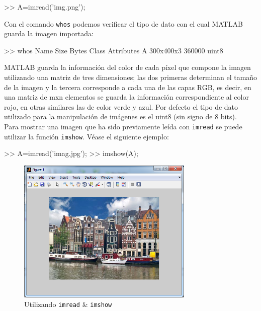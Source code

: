 \begin{matlab}
>> A=imread('img.png');
\end{matlab}

Con el comando \texttt{whos} podemos verificar el tipo de dato con el
cual MATLAB guarda la imagen importada:

\begin{matlab}
>> whos
  Name        Size                Bytes  Class    Attributes
  A         300x400x3            360000  uint8    
\end{matlab}

MATLAB guarda la información del color de cada píxel que compone la
imagen utilizando una matriz de tres dimensiones; las dos primeras
determinan el tamaño de la imagen y la tercera corresponde a cada una de
las capas RGB, es decir, en una matriz de mxn elementos se guarda la
información correspondiente al color rojo, en otras similares las de
color verde y azul. Por defecto el tipo de dato utilizado para la
manipulación de imágenes es el uint8 (sin signo de 8 bits). \\

Para mostrar una imagen que ha sido previamente leída con \texttt{imread} se
puede utilizar la función \texttt{imshow}. Véase el siguiente ejemplo:

\begin{matlab}
>> A=imread('imag.jpg');
>> imshow(A);
\end{matlab}

\begin{figure}[htbp]
    \centering
    \includegraphics[width=0.75\textwidth]{images/ch7/holland_imshow.png}
    \caption{Utilizando \texttt{imread} & \texttt{imshow}}
    \label{fig:holland_imshow}
\end{figure}


